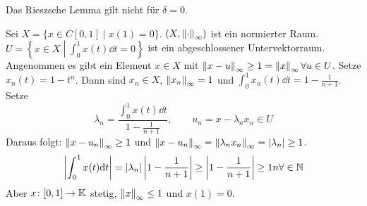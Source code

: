 \begin{bemerkung*}
Das Rieszsche Lemma gilt nicht f\"ur $ \delta=0 $.
\begin{beispiel*}
Sei $ X=\lbrace x\in C[0,1]\mid x(1)=0\rbrace $. $ (X,\left\|\cdot\right\|_\infty) $ ist ein normierter Raum. $ U=\left\lbrace x\in X\middle| \int_0^1x(t)\dd t=0\right\rbrace $ ist ein abgeschlossener Untervektorraum.\\
Angenommen es gibt ein Element $ x\in X $ mit $ \left\|x-u\right\|_\infty\geq 1=\left\|x\right\|_\infty\forall u\in U $. Setze $ x_n(t)=1-t^n $. Dann sind $ x_n\in X $, $ \left\|x_n\right\|_\infty=1 $ und $ \int_0^1x_n(t)\dd t=1-\frac{1}{n+1} $. Setze
\[ \lambda_n=\frac{\int_0^1 x(t)\dd t}{1-\frac{1}{n+1}},\qquad u_n=x-\lambda_nx_n\in U \]
Daraus folgt: $ \left\|x-u_n\right\|_\infty\geq 1 $ und $ \left\|x-u_n\right\|_\infty=\left\|\lambda_nx_n\right\|_\infty=|\lambda_n|\geq 1 $.
\[ \left|\int_0^1 x(t)\mathrm d t\right|=|\lambda_n|\left|1-\frac{1}{n+1}\right|\geq\left|1-\frac{1}{n+1}\right|\geq 1 n\forall\in\mathbb{N} \]
Aber $ x\colon[0,1]\rightarrow\mathbb{K} $ stetig, $ \left\|x\right\|_\infty\leq 1 $ und $ x(1)=0 $.
\end{beispiel*}
\end{bemerkung*}
